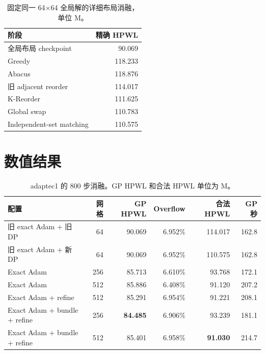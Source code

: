 \documentclass[11pt,a4paper]{ctexart}
\begin{document}
\begin{table}[H]
\centering
\caption{固定同一 64$\times$64 全局解的详细布局消融，单位 M。}
\label{tab:dp-ablation}
\begin{tabular}{lr}
\toprule
阶段 & 精确 HPWL\\
\midrule
全局布局 checkpoint & 90.069\\
Greedy & 118.233\\
Abacus & 118.876\\
旧 adjacent reorder & 114.017\\
K-Reorder & 111.625\\
Global swap & 110.783\\
Independent-set matching & 110.575\\
\bottomrule
\end{tabular}
\end{table}

\section{数值结果}

\begin{table}[H]
\centering
\small
\caption{adaptec1 的 800 步消融。GP HPWL 和合法 HPWL 单位为 M。}
\label{tab:results}
\begin{tabular}{lrrrrr}
\toprule
配置 & 网格 & GP HPWL & Overflow & 合法 HPWL & GP 秒\\
\midrule
旧 exact Adam + 旧 DP & 64 & 90.069 & 6.952\% & 114.017 & 162.8\\
旧 exact Adam + 新 DP & 64 & 90.069 & 6.952\% & 110.575 & 162.8\\
Exact Adam & 256 & 85.713 & 6.610\% & 93.768 & 172.1\\
Exact Adam & 512 & 85.886 & 6.408\% & 91.120 & 207.2\\
Exact Adam + refine & 512 & 85.291 & 6.954\% & 91.221 & 208.1\\
Exact Adam + bundle + refine & 256 & \textbf{84.485} & 6.906\% & 93.239 & 181.1\\
Exact Adam + bundle + refine & 512 & 85.401 & 6.958\% & \textbf{91.030} & 214.7\\
\bottomrule
\end{tabular}
\end{table}
\end{document}
